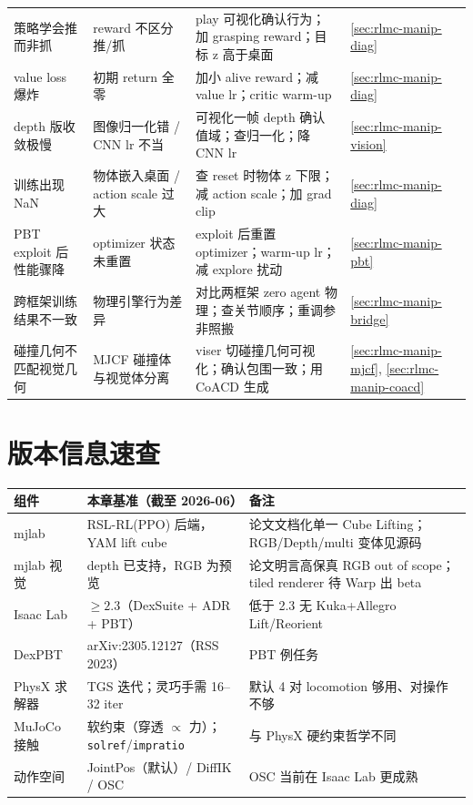 \begin{center}
\begin{tabular}{@{}p{3.2cm}p{3.0cm}p{4.4cm}l@{}}
策略学会推而非抓 & reward 不区分推/抓 & play 可视化确认行为；加 grasping reward；目标 z 高于桌面 & \cref{sec:rlmc-manip-diag} \\
value loss 爆炸 & 初期 return 全零 & 加小 alive reward；减 value lr；critic warm-up & \cref{sec:rlmc-manip-diag} \\
depth 版收敛极慢 & 图像归一化错 / CNN lr 不当 & 可视化一帧 depth 确认值域；查归一化；降 CNN lr & \cref{sec:rlmc-manip-vision} \\
训练出现 NaN & 物体嵌入桌面 / action scale 过大 & 查 reset 时物体 z 下限；减 action scale；加 grad clip & \cref{sec:rlmc-manip-diag} \\
PBT exploit 后性能骤降 & optimizer 状态未重置 & exploit 后重置 optimizer；warm-up lr；减 explore 扰动 & \cref{sec:rlmc-manip-pbt} \\
跨框架训练结果不一致 & 物理引擎行为差异 & 对比两框架 zero agent 物理；查关节顺序；重调参非照搬 & \cref{sec:rlmc-manip-bridge} \\
碰撞几何不匹配视觉几何 & MJCF 碰撞体与视觉体分离 & viser 切碰撞几何可视化；确认包围一致；用 CoACD 生成 & \cref{sec:rlmc-manip-mjcf}, \cref{sec:rlmc-manip-coacd} \\
\bottomrule
\end{tabular}
\end{center}

\section*{版本信息速查}
\label{sec:rlmc-manip-versions}

\begin{center}
\small
\begin{tabular}{@{}lll@{}}
\toprule
组件 & 本章基准（截至 2026-06） & 备注 \\
\midrule
mjlab & RSL-RL(PPO) 后端，YAM lift cube & 论文文档化单一 Cube Lifting；RGB/Depth/multi 变体见源码 \\
mjlab 视觉 & depth 已支持，RGB 为预览 & 论文明言高保真 RGB out of scope；tiled renderer 待 Warp 出 beta \\
Isaac Lab & $\ge 2.3$（DexSuite + ADR + PBT） & 低于 2.3 无 Kuka+Allegro Lift/Reorient \\
DexPBT & arXiv:2305.12127（RSS 2023） & PBT 例任务 \Verb[breaklines]|Isaac-Dexsuite-Kuka-Allegro-Lift-v0| \\
PhysX 求解器 & TGS 迭代；灵巧手需 16--32 iter & 默认 4 对 locomotion 够用、对操作不够 \\
MuJoCo 接触 & 软约束（穿透 $\propto$ 力）；\verb|solref|/\allowbreak\verb|impratio| & 与 PhysX 硬约束哲学不同 \\
动作空间 & JointPos（默认）/ DiffIK / OSC & OSC 当前在 Isaac Lab 更成熟 \\
\bottomrule
\end{tabular}
\end{center}

